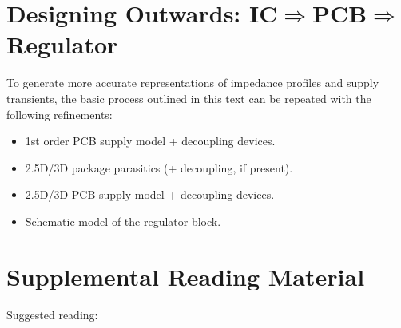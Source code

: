 \section{Designing Outwards: IC$\Rightarrow$PCB$\Rightarrow$Regulator}
\par To generate more accurate representations of impedance profiles and
supply transients, the basic process outlined in this text can be
repeated with the following refinements:
%
\begin{itemize}[noitemsep]
\item 1st order PCB supply model + decoupling devices.
\item 2.5D/3D package parasitics (+ decoupling, if present).
\item 2.5D/3D PCB supply model + decoupling devices.
\item Schematic model of the regulator block.
\end{itemize}
%
\section{Supplemental Reading Material}
\par\noindent Suggested reading:
\par%
\cite{tr:Carter_2001}\cite{tr:Martin_Dateunkn}
\cite{tr:ADI_2009}\cite{tr:Zumbahlen_2012}\cite{tr:Kester_2017}
\cite{tr:Renesas_2011}
%
